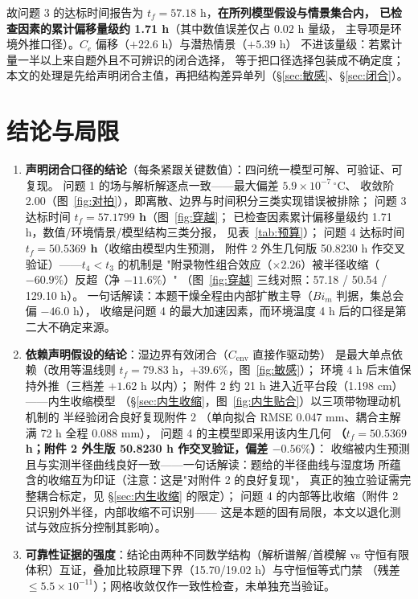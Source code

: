 \documentclass[12pt,a4paper]{ctexart}
\numberwithin{equation}{section}
\begin{document}
故问题 3 的达标时间报告为 $t_f=57.18$ h，\textbf{在所列模型假设与情景集合内，
已检查因素的累计偏移量级约 1.71 h}（其中数值误差仅占 $0.02$ h 量级，
主导项是环境外推口径）。$C_e$ 偏移（$+22.6$ h）与潜热情景（$+5.39$ h）
不进该量级：若累计量一半以上来自题外且不可辨识的闭合选择，
等于把口径选择包装成不确定度；
本文的处理是先给声明闭合主值，再把结构差异单列（\S\ref{sec:敏感}、\S\ref{sec:闭合}）。

\section{结论与局限}\label{sec:结论}
\begin{enumerate}
  \item \textbf{声明闭合口径的结论}（每条紧跟关键数值）：四问统一模型可解、可验证、可复现。
        问题 1 的场与解析解逐点一致——最大偏差 $5.9\times10^{-7}\,^{\circ}$C、
        收敛阶 2.00（图~\ref{fig:对拍}），即离散、边界与时间积分三类实现错误被排除；
        问题 3 达标时间 \textbf{$t_f=57.1799$ h}（图~\ref{fig:穿越}；
        已检查因素累计偏移量级约 1.71 h，数值/环境情景/模型结构三类分报，
        见表~\ref{tab:预算}）；
        问题 4 达标时间 \textbf{$t_f=50.5369$ h}（收缩由模型内生预测，
        附件 2 外生几何版 50.8230 h 作交叉验证）——$t_4<t_3$ 的机制是
        "附录物性组合效应（$\times2.26$）被半径收缩（$-60.9\%$）反超（净 $-11.6\%$）"
        （图~\ref{fig:穿越} 三线对照：57.18 / 50.54 / 129.10 h）。
        一句话解读：本题干燥全程由内部扩散主导（$Bi_m$ 判据，集总会偏 $-46.0$ h），
        收缩是问题 4 的最大加速因素，而环境温度 4 h 后的口径是第二大不确定来源。
  \item \textbf{依赖声明假设的结论}：湿边界有效闭合（$C_{\mathrm{env}}$ 直接作驱动势）
        是最大单点依赖（改用等温线则 $t_f=79.83$ h，$+39.6\%$，图~\ref{fig:敏感}）；
        环境 4 h 后末值保持外推（三档差 $+1.62$ h 以内）；
        附件 2 约 21 h 进入近平台段（1.198 cm）——内生收缩模型
        （\S\ref{sec:内生收缩}，图~\ref{fig:内生贴合}）以三项带物理动机机制的
        半经验闭合良好复现附件 2
        （单向拟合 RMSE 0.047 mm、耦合主解满 72 h 全程 0.088 mm），
        问题 4 的主模型即采用该内生几何
        \textbf{（$t_f=50.5369$ h；附件 2 外生版 50.8230 h 作交叉验证，偏差 $-0.56\%$）}：
        收缩被内生预测且与实测半径曲线良好一致——一句话解读：题给的半径曲线与湿度场
        所蕴含的收缩互为印证（注意：这是"对附件 2 的良好复现"，
        真正的独立验证需完整耦合标定，见 \S\ref{sec:内生收缩} 的限定）；
        问题 4 的内部等比收缩（附件 2 只识别外半径，内部收缩不可识别——
        这是本题的固有局限，本文以退化测试与效应拆分控制其影响）。
  \item \textbf{可靠性证据的强度}：结论由两种不同数学结构（解析谱解/首模解 vs
        守恒有限体积）互证，叠加比较原理下界（15.70/19.02 h）与守恒恒等式门禁
        （残差 $\le5.5\times10^{-11}$）；网格收敛仅作一致性检查，未单独充当验证。
\end{enumerate}
\end{document}

